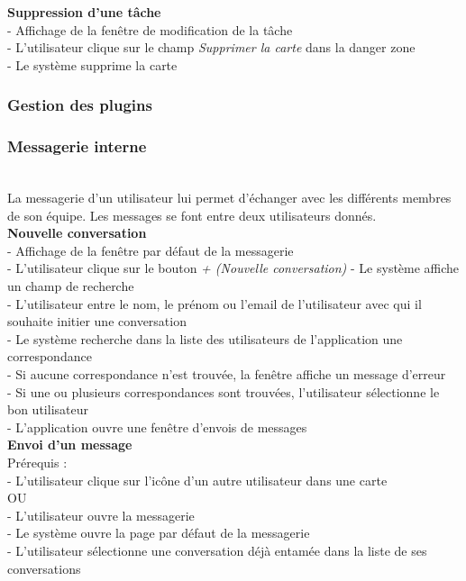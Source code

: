 \documentclass[conference]{IEEEtran}
\begin{document}
\textbf{Suppression d'une tâche}\\
- Affichage de la fenêtre de modification de la tâche\\
- L'utilisateur clique sur le champ \textit{Supprimer la carte} dans la danger zone\\
- Le système supprime la carte\\

\subsubsection{Gestion des plugins}

\subsubsection{Messagerie interne}\hfill\\

La messagerie d'un utilisateur lui permet d'échanger avec les différents membres de son équipe. Les messages se font entre deux utilisateurs donnés.\\

\textbf{Nouvelle conversation}\\
- Affichage de la fenêtre par défaut de la messagerie\\
- L'utilisateur clique sur le bouton \textit{+ (Nouvelle conversation)}
- Le système affiche un champ de recherche\\
- L'utilisateur entre le nom, le prénom ou l'email de l'utilisateur avec qui il souhaite initier une conversation\\
- Le système recherche dans la liste des utilisateurs de l'application une correspondance\\
- Si aucune correspondance n'est trouvée, la fenêtre affiche un message d'erreur\\
- Si une ou plusieurs correspondances sont trouvées, l'utilisateur sélectionne le bon utilisateur\\
- L'application ouvre une fenêtre d'envois de messages\\

\textbf{Envoi d'un message}\\
Prérequis :\\
- L'utilisateur clique sur l'icône d'un autre utilisateur dans une carte\\
OU\\
- L'utilisateur ouvre la messagerie\\
- Le système ouvre la page par défaut de la messagerie\\
- L'utilisateur sélectionne une conversation déjà entamée dans la liste de ses conversations\\
\end{document}
